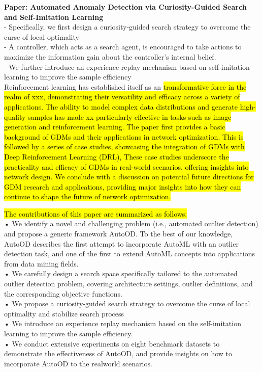 \documentclass{article}
\newcommand{\hlc}[2][blue!10]{{\colorlet{foo}{#1} \sethlcolor{foo}\hl{#2}}}
\begin{document}
		
		\textbf{Paper: Automated Anomaly Detection via Curiosity-Guided Search and Self-Imitation Learning}\\
		- Specifically, we first design a curiosity-guided search strategy to overcome the curse of local optimality\\
		- A controller, which acts as a search agent, is encouraged to take actions to maximize the information gain about the controller's internal belief.\\
		- We further introduce an experience replay mechanism based on self-imitation learning to improve the sample efficiency\\
		
		Reinforcement learning has established itself as an \hlc{transformative force in the realm of xxx, demonstrating their versatility and efficacy across a variety of applications. The ability to model complex data distributions and generate high-quality samples has made xx particularly effective in tasks such as image generation and reinforcement learning. The paper first provides a basic background of GDMs and their applications in network optimization. This is followed by a series of case studies, showcasing the integration of GDMs with Deep Reinforcement Learning (DRL), These case studies underscore the practicality and efficacy of GDMs in real-world scenarios, offering insights into network design. We conclude with a discussion on potential future directions for GDM research and applications, providing major insights into how they can continue to shape the future of network optimization.}
		
		
		\hlc{The contributions of this paper are summarized as follows:}\\
		• We identify a novel and challenging problem (i.e., automated outlier detection) and propose a generic framework AutoOD. To the best of our knowledge, AutoOD describes the first attempt to incorporate AutoML with an outlier detection task, and one of the first to extend AutoML concepts into applications from data mining fields.\\
		• We carefully design a search space specifically tailored to the automated outlier detection problem, covering architecture settings, outlier definitions, and the corresponding objective functions.\\
		• We propose a curiosity-guided search strategy to overcome the curse of local optimality and stabilize search process\\
		• We introduce an experience replay mechanism based on the self-imitation learning to improve the sample efficiency.\\
		• We conduct extensive experiments on eight benchmark datasets to demonstrate the effectiveness of AutoOD, and provide insights on how to incorporate AutoOD to the realworld scenarios.\\
		
\end{document}
